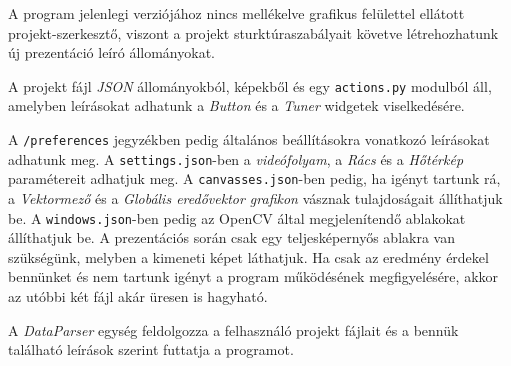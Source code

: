 

A program jelenlegi verziójához nincs mellékelve grafikus felülettel ellátott projekt-szerkesztő, viszont a projekt sturktúraszabályait követve létrehozhatunk új prezentáció leíró állományokat.

\bigskip


\bigskip

\noindent A projekt fájl \textit{JSON} állományokból, képekből és egy \texttt{actions.py} modulból áll, amelyben leírásokat adhatunk a \textit{Button} és a \textit{Tuner} widgetek viselkedésére.

A \texttt{/preferences} jegyzékben pedig általános beállításokra vonatkozó leírásokat adhatunk meg. A \texttt{settings.json}-ben a \textit{videófolyam}, a \textit{Rács} és a \textit{Hőtérkép} paramétereit adhatjuk meg. A
\texttt{canvasses.json}-ben pedig, ha igényt tartunk rá, a \textit{Vektormező} és a \textit{Globális eredővektor grafikon} vásznak tulajdoságait állíthatjuk be.
A \texttt{windows.json}-ben pedig az OpenCV által megjelenítendő ablakokat állíthatjuk be. A prezentációs során csak egy teljesképernyős ablakra van szükségünk, melyben a kimeneti képet láthatjuk. Ha csak az eredmény érdekel bennünket és nem tartunk igényt a program működésének megfigyelésére, akkor az utóbbi két fájl akár üresen is hagyható.

A \textit{DataParser} egység feldolgozza a felhasználó projekt fájlait és a bennük található leírások szerint futtatja a programot.

